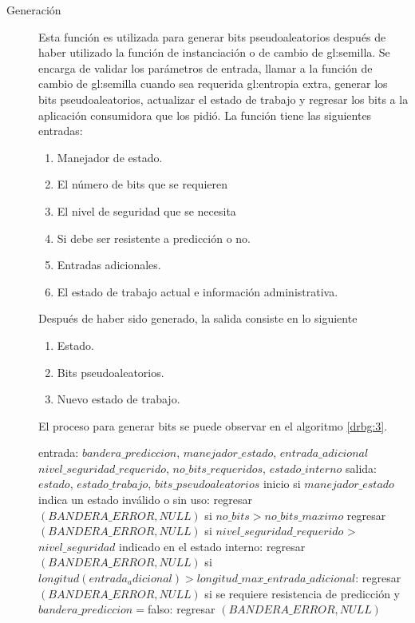 \begin{description}
  \item [Generación] Esta función es utilizada para generar bits
    pseudoaleatorios después de haber utilizado la función de instanciación o
    de cambio de \gls{gl:semilla}. Se encarga de validar los parámetros de
    entrada, llamar a la función de cambio de \gls{gl:semilla} cuando sea
    requerida \gls{gl:entropia} extra, generar los bits pseudoaleatorios,
    actualizar el estado de trabajo y regresar los bits a la aplicación
    consumidora que los pidió. La función tiene las siguientes entradas:
    \begin{enumerate}
      \item Manejador de estado.
      \item El número de bits que se requieren
      \item El nivel de seguridad que se necesita
      \item Si debe ser resistente a predicción o no.
      \item Entradas adicionales.
      \item El estado de trabajo actual e información administrativa.
    \end{enumerate}
    Después de haber sido generado, la salida consiste en lo siguiente
    \begin{enumerate}
      \item Estado.
      \item Bits pseudoaleatorios.
      \item Nuevo estado de trabajo.
    \end{enumerate}
    El proceso para generar bits se puede observar en el algoritmo \ref{drbg:3}.
    \begin{pseudocodigo}[caption={DRBG, generación.}, label={drbg:3}]
      entrada:  $bandera\_prediccion$, $manejador\_estado$, $entrada\_adicional$
                $nivel\_seguridad\_requerido$, $no\_bits\_requeridos$, $estado\_interno$
      salida:   $estado$, $estado\_trabajo$, $bits\_pseudoaleatorios$
      inicio
        si $manejador\_estado$ indica un estado inválido o sin uso:
          regresar $(BANDERA\_ERROR, NULL)$
        si $no\_bits > no\_bits\_maximo$
          regresar $(BANDERA\_ERROR, NULL)$
        si $nivel\_seguridad\_requerido$ > $nivel\_seguridad$ indicado en el estado interno:
          regresar $(BANDERA\_ERROR, NULL)$
        si $longitud(entrada_adicional) > longitud\_max\_entrada\_adicional$:
          regresar $(BANDERA\_ERROR, NULL)$
        si se requiere resistencia de predicción y $bandera\_prediccion=$falso:
          regresar $(BANDERA\_ERROR, NULL)$

\end{pseudocodigo}
\end{description}
